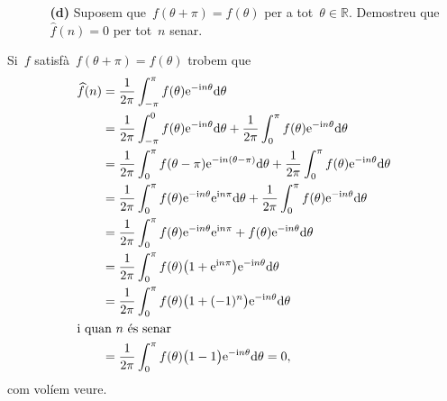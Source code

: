 \documentclass[a4paper]{article}
\newcommand{\iu}{\mathrm{i}}
\newcommand{\e}{\mathrm{e}}
\providecommand{\uppi}{\pi}
\newcommand{\diff}{\mathrm{d}}
\begin{document}
\begin{enumerate}
    \item[]\begin{enumerate}
        \item[\textbf{(d)}] Suposem que~\(f(\theta + \uppi) = f(\theta)\) per a
            tot~\(\theta\in\mathbb{R}\). Demostreu que~\(\widehat{f}(n) = 0\)
            per tot~\(n\) senar.
    \end{enumerate}
\end{enumerate}
Si~\(f\) satisfà~\(f(\theta + \uppi) = f(\theta)\) trobem que
\begin{align*}
    \widehat{f}(n) &= \frac{1}{2\uppi}
                      \int_{-\uppi}^{\uppi} f(\theta)\e^{-\iu n\theta}\diff
                      \theta \\
                   &= \frac{1}{2\uppi}
                      \int_{-\uppi}^{0} f(\theta)\e^{-\iu n\theta}\diff
                      \theta + \frac{1}{2\uppi}
                      \int_{0}^{\uppi} f(\theta)\e^{-\iu n\theta}\diff
                      \theta \\
                   &= \frac{1}{2\uppi}
                      \int_{0}^{\uppi} f(\theta-\uppi)
                      \e^{-\iu n(\theta-\uppi)}\diff
                      \theta + \frac{1}{2\uppi}
                      \int_{0}^{\uppi} f(\theta)\e^{-\iu n\theta}\diff
                      \theta \\
                   &= \frac{1}{2\uppi}
                      \int_{0}^{\uppi} f(\theta)
                      \e^{-\iu n\theta}
                      \e^{\iu n\uppi}
                      \diff\theta + \frac{1}{2\uppi}
                      \int_{0}^{\uppi} f(\theta)\e^{-\iu n\theta}\diff
                      \theta \\
                   &= \frac{1}{2\uppi}
                      \int_{0}^{\uppi}
                      f(\theta)
                      \e^{-\iu n\theta}
                      \e^{\iu n\uppi}
                      + f(\theta)\e^{-\iu n\theta}\diff
                      \theta \\
                   &= \frac{1}{2\uppi}
                      \int_{0}^{\uppi}
                      f(\theta)\bigl(1 + \e^{\iu n\uppi}\bigr)
                      \e^{-\iu n\theta}
                      \diff\theta \\
                   &= \frac{1}{2\uppi}
                      \int_{0}^{\uppi}
                      f(\theta)\bigl(1 + (-1)^{n}\bigr)
                      \e^{-\iu n\theta}
                      \diff\theta \\
                      \intertext{i quan~\(n\) és senar}
                   &= \frac{1}{2\uppi}
                      \int_{0}^{\uppi}
                      f(\theta)\bigl(1 - 1\bigr)
                      \e^{-\iu n\theta}
                      \diff\theta = 0,
\end{align*}
com volíem veure.
\end{document}
